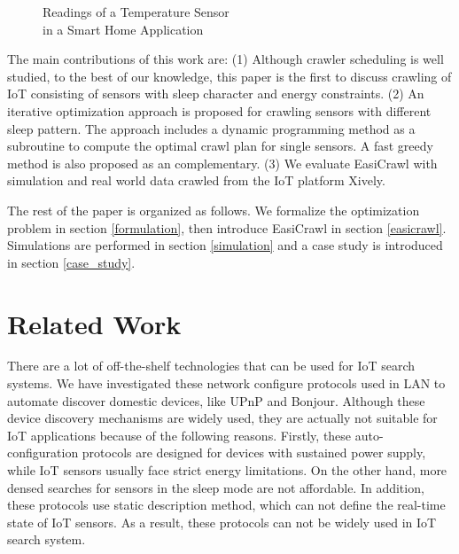\documentclass[conference]{IEEEtran}
\begin{document}
\begin{figure}
	\centering
	\hspace{-3.0em}
	
	\captionsetup{justification=centering}
	\caption{Readings of a Temperature Sensor\\ in a Smart Home Application}
	\vspace{-1.0em}
	\label{fig:smarthome}
\end{figure}

The main contributions of this work are:
(1) Although crawler scheduling is well studied, to the best of our knowledge, this paper is the first to discuss crawling of IoT consisting of sensors with sleep character and energy constraints.
(2) An iterative optimization approach is proposed for crawling sensors with different sleep pattern. 
The approach includes a dynamic programming method as a subroutine to compute the optimal crawl plan for single sensors. 
A fast greedy method is also proposed as an complementary.
(3) We evaluate EasiCrawl with simulation and real world data crawled from the IoT platform Xively\cite{xively}.

The rest of the paper is organized as follows. 
We formalize the optimization problem in section \ref{formulation}, then introduce EasiCrawl in section \ref{easicrawl}. 
Simulations are performed in section \ref{simulation} and a case study is introduced in section \ref{case_study}. 

\section{Related Work}\label{related_work}

There are a lot of off-the-shelf technologies that can be used for IoT search systems.
We have investigated these network configure protocols used in LAN to automate discover domestic devices, like UPnP\cite{UPnP} and Bonjour\cite{Bonjour}.
Although these device discovery mechanisms are widely used, they are actually not suitable for IoT applications because of the following reasons. 
Firstly, these auto-configuration protocols are designed for devices with sustained power supply, while IoT sensors usually face strict energy limitations.
On the other hand, more densed searches for sensors in the sleep mode are not affordable.
In addition, these protocols use static description method, which can not define the real-time state of IoT sensors.
As a result, these protocols can not be widely used in IoT search system.
\end{document}
